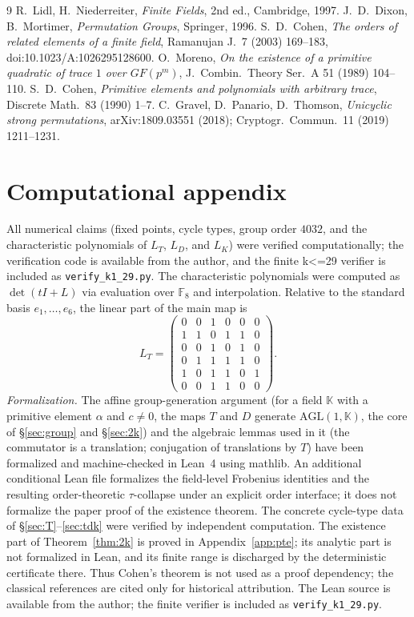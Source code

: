 \documentclass[11pt]{article}
\begin{document}
\begin{thebibliography}{9}
 R.~Lidl, H.~Niederreiter, \emph{Finite Fields}, 2nd ed., Cambridge, 1997.
 J.~D.~Dixon, B.~Mortimer, \emph{Permutation Groups}, Springer, 1996.
 S.~D.~Cohen, \emph{The orders of related elements of a finite field}, Ramanujan J.~7 (2003) 169--183, doi:10.1023/A:1026295128600.
 O.~Moreno, \emph{On the existence of a primitive quadratic of trace $1$ over $GF(p^m)$}, J.~Combin.~Theory Ser.~A 51 (1989) 104--110.
 S.~D.~Cohen, \emph{Primitive elements and polynomials with arbitrary trace}, Discrete Math.~83 (1990) 1--7.
 C.~Gravel, D.~Panario, D.~Thomson, \emph{Unicyclic strong permutations}, arXiv:1809.03551 (2018); Cryptogr.~Commun.~11 (2019) 1211--1231.
\end{thebibliography}

\appendix
\section{Computational appendix}\label{app:code}
All numerical claims (fixed points, cycle types, group order $4032$, and the
characteristic polynomials of $L_T$, $L_D$, and $L_K$) were verified
computationally; the verification code is available from the author, and the finite k<=29 verifier is included as \texttt{verify\_k1\_29.py}. The characteristic
polynomials were computed as $\det(tI+L)$ via evaluation over $\mathbb{F}_8$ and
interpolation. Relative to the standard basis $e_1,\dots,e_6$, the linear part of
the main map is
\[
L_T=\begin{pmatrix}
0&0&1&0&0&0\\
1&1&0&1&1&0\\
0&0&1&0&1&0\\
0&1&1&1&1&0\\
1&0&1&1&0&1\\
0&0&1&1&0&0
\end{pmatrix}.
\]
\emph{Formalization.} The affine group-generation argument (for a field $\mathbb K$ with a primitive
element $\alpha$ and $c\ne0$, the maps $T$ and $D$ generate $\mathrm{AGL}(1,\mathbb K)$, the core
of \S\ref{sec:group} and \S\ref{sec:2k}) and the algebraic lemmas used in it (the commutator
is a translation; conjugation of translations by $T$) have been formalized and
machine-checked in Lean~4 using mathlib. An additional conditional Lean file
formalizes the field-level Frobenius identities and the resulting
order-theoretic $\tau$-collapse under an explicit order interface; it does not
formalize the paper proof of the existence theorem. The concrete cycle-type data of
\S\ref{sec:T}--\ref{sec:tdk} were verified by independent computation. The existence
part of Theorem~\ref{thm:2k} is proved in Appendix~\ref{app:pte}; its analytic part
is not formalized in Lean, and its finite range is discharged by the deterministic
certificate there. Thus Cohen's theorem is not used as a proof dependency; the
classical references are cited only for historical attribution. The Lean source is
available from the author; the finite verifier is included as
\texttt{verify\_k1\_29.py}.
\end{document}
